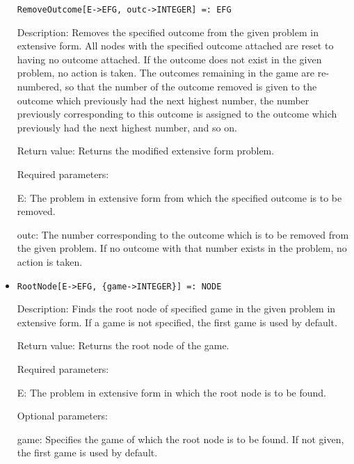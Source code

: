 \begin{itemize}
\protect \large \begin{verbatim}
RemoveOutcome[E->EFG, outc->INTEGER] =: EFG
\end{verbatim}\normalsize

\bd
\item
[Description:] Removes the specified outcome from the given problem in
extensive form.  All nodes with the specified outcome attached are
reset to having no outcome attached.  If the outcome does not exist in
the given problem, no action is taken.  The outcomes remaining in the
game are re-numbered, so that the number of the outcome removed is
given to the outcome which previously had the next highest number, the
number previously corresponding to this outcome is assigned to the
outcome which previously had the next highest number, and so on.
\item  
[Return value:] Returns the modified extensive form problem.
\item
[Required parameters:]\hfil\null
	
\bd
\item
[E:] The problem in extensive form from which the specified outcome is
to be removed.
\item
[outc:] The number corresponding to the outcome which is to be removed
from the given problem.  If no outcome with that number exists in the
problem, no action is taken.
\ed
\ed

\item
\protect \large \begin{verbatim}
RootNode[E->EFG, {game->INTEGER}] =: NODE
\end{verbatim}\normalsize

\bd
\item
[Description:] Finds the root node of specified game in the given
problem in extensive form.  If a game is not specified, the first game
is used by default.
\item
[Return value:] Returns the root node of the game.
\item
[Required parameters:]\hfil\null
	
\bd
\item
[E:] The problem in extensive form in which the root node is to be
found.
\ed

\item
[Optional parameters:]\hfil\null

\bd
\item
[game:] Specifies the game of which the root node is to be found.  If
not given, the first game is used by default.
\ed
\ed


\end{itemize}
